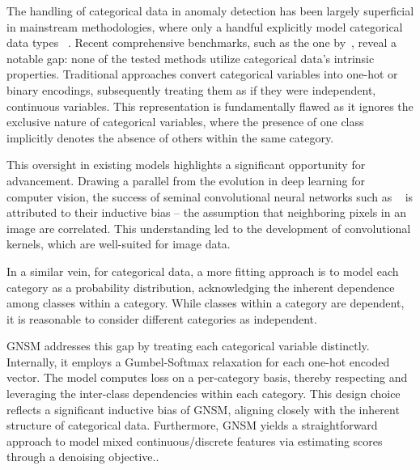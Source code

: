 The handling of categorical data in anomaly detection has been largely superficial in mainstream methodologies, where only a handful explicitly model categorical data types ~\cite{pang2021homophily}. Recent comprehensive benchmarks, such as the one by~\cite{han2022adbench}, reveal a notable gap: none of the tested methods utilize categorical data's intrinsic properties. Traditional approaches convert categorical variables into one-hot or binary encodings, subsequently treating them as if they were independent, continuous variables. This representation is fundamentally flawed as it ignores the exclusive nature of categorical variables, where the presence of one class implicitly denotes the absence of others within the same category.

This oversight in existing models highlights a significant opportunity for advancement. Drawing a parallel from the evolution in deep learning for computer vision, the success of seminal convolutional neural networks such as ~\cite{alexnet,vgg} is attributed to their inductive bias – the assumption that neighboring pixels in an image are correlated. This understanding led to the development of convolutional kernels, which are well-suited for image data.

In a similar vein, for categorical data, a more fitting approach is to model each category as a probability distribution, acknowledging the inherent dependence among classes within a category. While classes within a category are dependent, it is reasonable to consider different categories as independent.

GNSM addresses this gap by treating each categorical variable distinctly. Internally, it employs a Gumbel-Softmax relaxation for each one-hot encoded vector. The model computes loss on a per-category basis, thereby respecting and leveraging the inter-class dependencies within each category. This design choice reflects a significant inductive bias of GNSM, aligning closely with the inherent structure of categorical data.  Furthermore, GNSM yields a straightforward approach to model mixed continuous/discrete features via estimating scores through a denoising objective..


